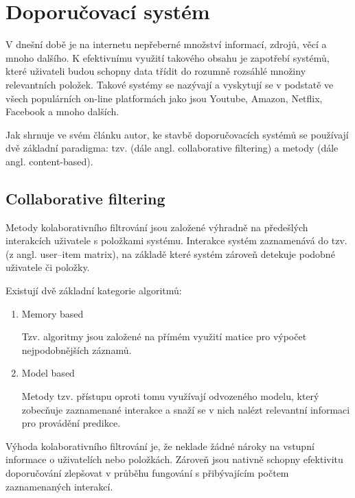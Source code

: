 \documentclass[thesis=M,czech]{FITthesis}[2019/12/23]
\begin{document}
\chapter{Doporučovací systém}

V dnešní době je na internetu nepřeberné množství informací, zdrojů, věcí a mnoho dalšího. K efektivnímu využití takového obsahu je zapotřebí systémů, které uživateli budou schopny data třídit do rozumně rozsáhlé množiny relevantních položek. Takové systémy se nazývají  a vyskytují se v podstatě ve všech populárních on-line platformách jako jsou Youtube, Amazon, Netflix, Facebook a mnoho dalších.

Jak shrnuje ve svém článku\cite{rocca2019} autor, ke stavbě doporučovacích systémů se používají dvě základní paradigma: tzv.  (dále angl. collaborative filtering) a  metody (dále angl. content-based).

\section{Collaborative filtering}

Metody kolaborativního filtrování jsou založené výhradně na předešlých interakcích uživatele s položkami systému. Interakce systém zaznamenává do tzv. (z angl. user--item matrix), na základě které systém zároveň detekuje podobné uživatele či položky.

Existují dvě základní kategorie algoritmů:
\begin{enumerate}
    \item Memory based
    
    Tzv.  algoritmy jsou založené na přímém využití matice pro výpočet nejpodobnějších záznamů.
    
    \item Model based
    
    Metody tzv.  přístupu oproti tomu využívají odvozeného modelu, který zobecňuje zaznamenané interakce a snaží se v nich nalézt relevantní informaci pro provádění predikce.
    
\end{enumerate}

Výhoda kolaborativního filtrování je, že neklade žádné nároky na vstupní informace o uživatelích nebo položkách. Zároveň jsou nativně schopny efektivitu doporučování zlepšovat v průběhu fungování s přibývajícím počtem zaznamenaných interakcí.
\end{document}
